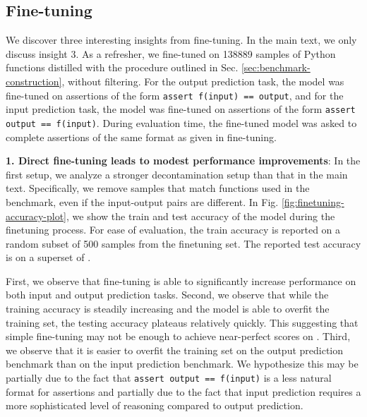 \subsection{Fine-tuning} \label{subsec:appendix-finetuning}
We discover three interesting insights from fine-tuning. In the main text, we only discuss insight 3. As a refresher, we fine-tuned \codellamalarge on 138889 samples of Python functions distilled with the procedure outlined in Sec. \ref{sec:benchmark-construction}, without filtering. For the output prediction task, the model was fine-tuned on assertions of the form \texttt{assert f(input) == output}, and for the input prediction task, the model was fine-tuned on assertions of the form \texttt{assert output == f(input)}. During evaluation time, the fine-tuned model was asked to complete assertions of the same format as given in fine-tuning. 

\textbf{1. Direct fine-tuning leads to modest performance improvements}: In the first setup, we analyze a stronger decontamination setup than that in the main text. Specifically, we remove samples that match functions used in the benchmark, even if the input-output pairs are different. In Fig. \ref{fig:finetuning-accuracy-plot}, we show the train and test accuracy of the model during the finetuning process. For ease of evaluation, the train accuracy is reported on a random subset of 500 samples from the finetuning set. The reported test accuracy is on a superset of \benchmark. 

First, we observe that fine-tuning is able to significantly increase performance on both input and output prediction tasks. Second, we observe that while the training accuracy is steadily increasing and the model is able to overfit the training set, the testing accuracy plateaus relatively quickly. This suggesting that simple fine-tuning may not be enough to achieve near-perfect scores on \benchmark. Third, we observe that it is easier to overfit the training set on the output prediction benchmark than on the input prediction benchmark. We hypothesize this may be partially due to the fact that \texttt{assert output == f(input)} is a less natural format for assertions and partially due to the fact that input prediction requires a more sophisticated level of reasoning compared to output prediction.

